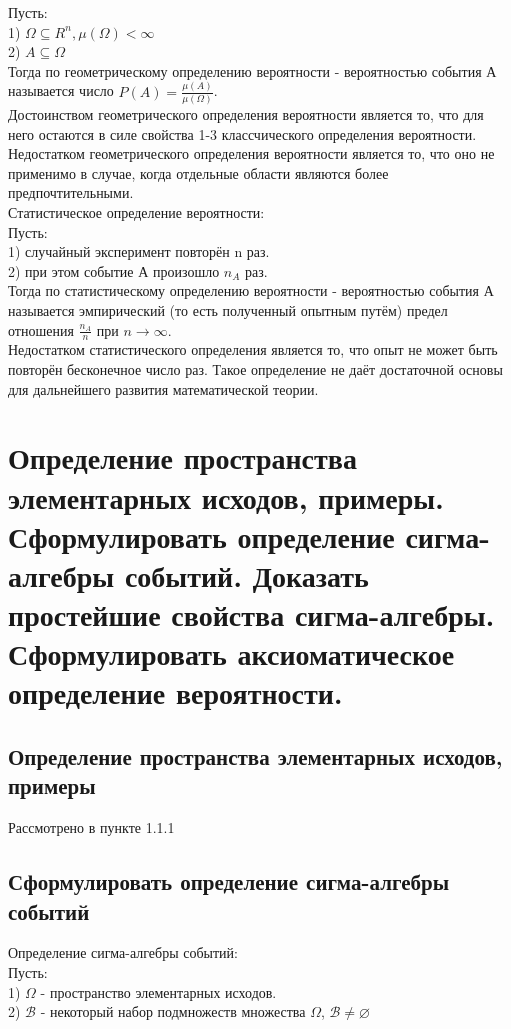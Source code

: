 Пусть:\\
1) $\Omega \subseteq R^{n}, \mu(\Omega) < \infty$\\
2) $A \subseteq \Omega$\\

Тогда по геометрическому определению вероятности - вероятностью события А называется число $P(A) = \frac{\mu(A)}{\mu(\Omega)}$.\\

Достоинством геометрического определения вероятности является то, что для него остаются в силе свойства 1-3 классчического определения вероятности.\\
Недостатком геометрического определения вероятности является то, что оно не применимо в случае, когда отдельные области являются более предпочтительными.\\

Статистическое определение вероятности:\\
Пусть:\\
1) случайный эксперимент повторён n раз.\\
2) при этом событие А произошло $n_{A}$ раз.\\

Тогда по статистическому определению вероятности - вероятностью события А называется эмпирический (то есть полученный опытным путём) предел отношения $\frac{n_{A}}{n}$ при $ n \rightarrow \infty$.\\

Недостатком статистического определения является то, что опыт не может быть повторён бесконечное число раз. Такое определение не даёт достаточной основы для дальнейшего развития математической теории.\\

\section{Определение пространства элементарных исходов, примеры. Сформулировать определение сигма-алгебры событий. Доказать простейшие свойства сигма-алгебры. Сформулировать аксиоматическое определение вероятности.}

\subsection{Определение пространства элементарных исходов, примеры}
Рассмотрено в пункте 1.1.1

\subsection{Сформулировать определение сигма-алгебры событий}
Определение сигма-алгебры событий:\\
Пусть:\\
1) $\Omega$ - пространство элементарных исходов.\\
2) $\mathcal{B}$ - некоторый набор подмножеств множества $\Omega$, $\mathcal{B} \neq \varnothing$\\

